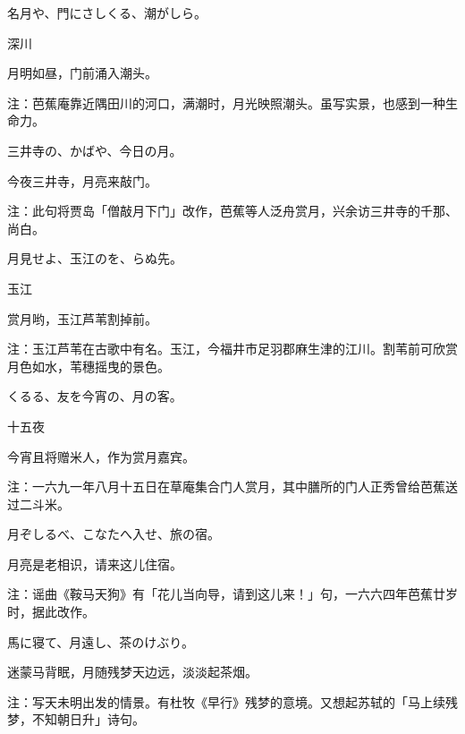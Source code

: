 \begin{haiku}
    {\FH 名月や、門にさしくる、潮がしら。}

    {\FK 深川}

    {\FK 月明如昼，门前涌入潮头。}

    {\FT 注：芭蕉庵靠近隅田川的河口，满潮时，月光映照潮头。虽写实景，也感到一种生命力。}
\end{haiku}

\begin{haiku}
    {\FH 三井寺の、かばや、今日の月。}

    {\FK 今夜三井寺，月亮来敲门。}

    {\FT 注：此句将贾岛「僧敲月下门」改作，芭蕉等人泛舟赏月，兴余访三井寺的千那、尚白。}
\end{haiku}

\begin{haiku}
    {\FH 月見せよ、玉江のを、らぬ先。}

    {\FK 玉江}

    {\FK 赏月哟，玉江芦苇割掉前。}

    {\FT 注：玉江芦苇在古歌中有名。玉江，今福井市足羽郡麻生津的江川。割苇前可欣赏月色如水，苇穗摇曳的景色。}
\end{haiku}

\begin{haiku}
    {\FH {}くるる、友を今宵の、月の客。}

    {\FK 十五夜}

    {\FK 今宵且将赠米人，作为赏月嘉宾。}

    {\FT 注：一六九一年八月十五日在草庵集合门人赏月，其中膳所的门人正秀曾给芭蕉送过二斗米。}
\end{haiku}

\begin{haiku}
    {\FH 月ぞしるべ、こなたへ入せ、旅の宿。}

    {\FK 月亮是老相识，请来这儿住宿。}

    {\FT 注：谣曲《鞍马天狗》有「花儿当向导，请到这儿来！」句，一六六四年芭蕉廿岁时，据此改作。}
\end{haiku}

\begin{haiku}
    {\FH 馬に寝て、月遠し、茶のけぶり。}

    {\FK 迷蒙马背眠，月随残梦天边远，淡淡起茶烟。}

    {\FT 注：写天未明出发的情景。有杜牧《早行》残梦的意境。又想起苏轼的「马上续残梦，不知朝日升」诗句。}
\end{haiku}

